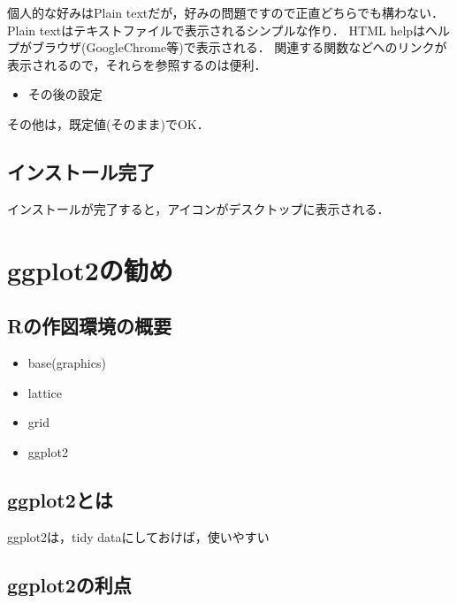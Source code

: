 \documentclass[
]{article}
\providecommand{\tightlist}{%
  \setlength{\itemsep}{0pt}\setlength{\parskip}{0pt}}
\begin{document}
個人的な好みはPlain textだが，好みの問題ですので正直どちらでも構わない．
Plain textはテキストファイルで表示されるシンプルな作り．
HTML helpはヘルプがブラウザ(GoogleChrome等)で表示される．
関連する関数などへのリンクが表示されるので，それらを参照するのは便利．

\begin{itemize}
\tightlist
\item
  その後の設定
\end{itemize}

その他は，既定値(そのまま)でOK．

\hypertarget{ux30a4ux30f3ux30b9ux30c8ux30fcux30ebux5b8cux4e86}{%
\subsection{インストール完了}\label{ux30a4ux30f3ux30b9ux30c8ux30fcux30ebux5b8cux4e86}}

インストールが完了すると，アイコンがデスクトップに表示される．

\hypertarget{ggplot2}{%
\section{ggplot2の勧め}\label{ggplot2}}

\hypertarget{rux306eux4f5cux56f3ux74b0ux5883ux306eux6982ux8981}{%
\subsection{Rの作図環境の概要}\label{rux306eux4f5cux56f3ux74b0ux5883ux306eux6982ux8981}}

\begin{itemize}
\tightlist
\item
  base(graphics)
\item
  lattice
\item
  grid
\item
  ggplot2
\end{itemize}

\hypertarget{ggplot2ux3068ux306f}{%
\subsection{ggplot2とは}\label{ggplot2ux3068ux306f}}

ggplot2は，tidy dataにしておけば，使いやすい

\hypertarget{ggplot2ux306eux5229ux70b9}{%
\subsection{ggplot2の利点}\label{ggplot2ux306eux5229ux70b9}}
\end{document}
